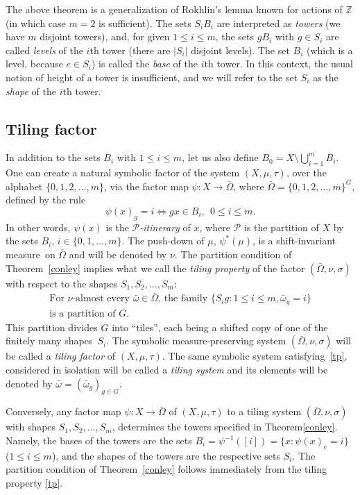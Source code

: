 \documentclass{amsart}
\theoremstyle{remark}
\def \Z {\mathbb Z}
\def \P {\mathcal P}
\def \im {invariant measure}
\begin{document}
The above theorem is a generalization of Rokhlin's lemma known for actions of $\Z$ (in which case $m=2$ is sufficient). The sets $S_iB_i$ are interpreted as \emph{towers} (we have $m$ disjoint towers), and, for given $1\le i\le m$, the sets $gB_i$ with $g\in S_i$ are called \emph{levels} of the $i$th tower (there are $|S_i|$ disjoint levels). The set $B_i$ (which is a level, because $e\in S_i$) is called the \emph{base} of the $i$th tower. 
In this context, the usual notion of height of a tower is insufficient, and we will refer to the set $S_i$ as the \emph{shape} of the $i$th tower.

\subsection{Tiling factor} In addition to the sets $B_i$ with $1\le i\le m$, let us also define $B_0=X\setminus\bigcup_{i=1}^mB_i$. One can create a natural symbolic factor of the system $(X,\mu,\tau)$, over the alphabet $\{0,1,2,\dots,m\}$, via the factor map $\psi:X\to\bar\Omega$, where $\bar\Omega=\{0,1,2,\dots,m\}^G$, defined by the rule
$$
\psi(x)_g = i \iff gx\in B_i, \ \ 0\le i\le m.
$$
In other words, $\psi(x)$ is the \emph{$\P$-itinerary} of $x$, where $\P$ is the partition of $X$ by the sets $B_i$, $i\in\{0,1,\dots,m\}$. The push-down of $\mu$,
$\psi^*(\mu)$, is a shift-\im\ on $\bar\Omega$ and will be denoted by $\nu$. The partition condition of Theorem~\ref{conley} implies what we call the \emph{tiling property} of the factor $(\bar\Omega,\nu,\sigma)$ with respect to the shapes $S_1,S_2,\dots,S_m$:
\begin{multline}\label{tp}
\text{For $\nu$-almost every $\bar\omega\in\bar\Omega$, the family $\{S_ig: 1\le i\le m, \bar\omega_g=i\}$}\\ \text{is a partition of $G$.}
\end{multline}
This partition divides $G$ into ``tiles'', each being a shifted copy of one of the finitely many shapes~$S_i$. The symbolic measure-preserving system $(\bar\Omega,\nu,\sigma)$ will be called a \emph{tiling factor} of $(X,\mu,\tau)$. The same symbolic system satisfying~\eqref{tp}, considered in isolation will be called a \emph{tiling system} and its elements will be denoted by $\bar\omega=(\bar\omega_g)_{g\in G}$.


Conversely, any factor map $\psi:X\to\bar\Omega$ of $(X,\mu,\tau)$ to a tiling system $(\bar\Omega,\nu,\sigma)$ with shapes $S_1,S_2,\dots,S_m$, determines the towers specified in Theorem\ref{conley}. Namely, the bases of the towers are the sets $B_i=\psi^{-1}([i])=\{x:\psi(x)_e=i\}$ ($1\le i\le m$), and the shapes of the towers are the respective sets $S_i$. The partition condition of Theorem~\ref{conley} follows immediately from the tiling property \eqref{tp}.
\end{document}
